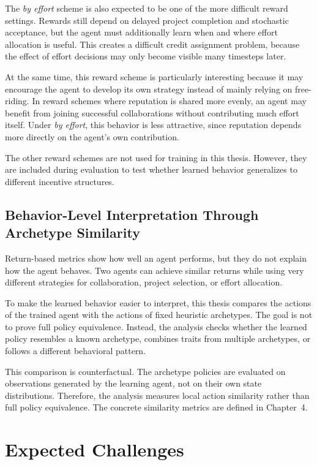 \documentclass[english,bachelor]{hsluthesis}
\begin{document}
The \textit{by effort} scheme is also expected to be one of the more difficult reward settings. Rewards still depend on delayed project completion and stochastic acceptance, but the agent must additionally learn when and where effort allocation is useful. This creates a difficult credit assignment problem, because the effect of effort decisions may only become visible many timesteps later.

At the same time, this reward scheme is particularly interesting because it may encourage the agent to develop its own strategy instead of mainly relying on free-riding. In reward schemes where reputation is shared more evenly, an agent may benefit from joining successful collaborations without contributing much effort itself. Under \textit{by effort}, this behavior is less attractive, since reputation depends more directly on the agent's own contribution.

The other reward schemes are not used for training in this thesis. However, they are included during evaluation to test whether learned behavior generalizes to different incentive structures.

\subsection{Behavior-Level Interpretation Through Archetype Similarity}

Return-based metrics show how well an agent performs, but they do not explain how the agent behaves. Two agents can achieve similar returns while using very different strategies for collaboration, project selection, or effort allocation.

To make the learned behavior easier to interpret, this thesis compares the actions of the trained agent with the actions of fixed heuristic archetypes. The goal is not to prove full policy equivalence. Instead, the analysis checks whether the learned policy resembles a known archetype, combines traits from multiple archetypes, or follows a different behavioral pattern.

This comparison is counterfactual. The archetype policies are evaluated on observations generated by the learning agent, not on their own state distributions. Therefore, the analysis measures local action similarity rather than full policy equivalence. The concrete similarity metrics are defined in Chapter~4.

\section{Expected Challenges}
\end{document}
